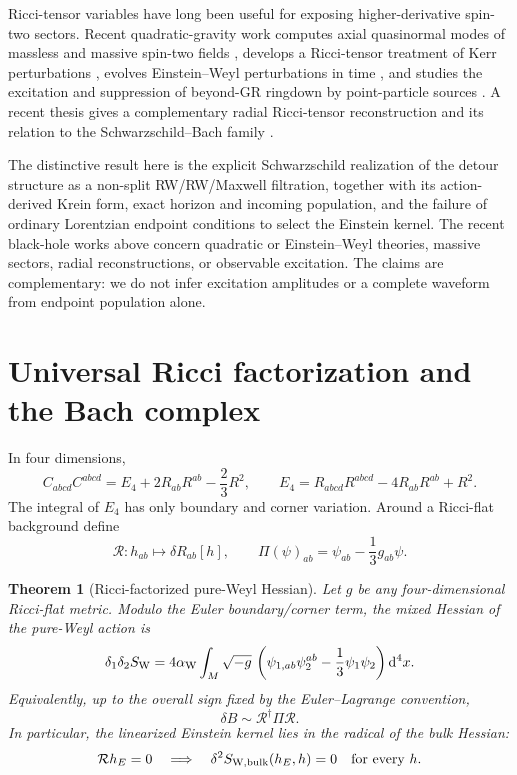 \documentclass[11pt]{article}
\newtheorem{theorem}{Theorem}[section]
\theoremstyle{definition}
\theoremstyle{remark}
\newcommand{\dd}{\mathrm d}
\begin{document}
Ricci-tensor variables have long been useful for exposing higher-derivative
spin-two sectors.  Recent quadratic-gravity work computes axial quasinormal
modes of massless and massive spin-two fields \cite{Antoniou2025}, develops a
Ricci-tensor treatment of Kerr perturbations \cite{Knoska2025}, evolves
Einstein--Weyl perturbations in time \cite{Konoplya2025}, and studies the
excitation and suppression of beyond-GR ringdown by point-particle sources
\cite{Antoniou2026}.  A recent thesis gives a complementary radial
Ricci-tensor reconstruction and its relation to the Schwarzschild--Bach
family \cite{Tajcovsky2026}.

The distinctive result here is the explicit Schwarzschild realization of
the detour structure as a non-split RW/RW/Maxwell filtration, together with
its action-derived Krein form, exact horizon and incoming population, and the
failure of ordinary Lorentzian endpoint conditions to select the Einstein
kernel.  The recent black-hole works above concern quadratic or
Einstein--Weyl theories, massive sectors, radial reconstructions, or
observable excitation.  The claims are complementary: we do not infer
excitation amplitudes or a complete waveform from endpoint population alone.

\section{Universal Ricci factorization and the Bach complex}
\label{sec:ricci-factorization}

In four dimensions,
\begin{equation}
\label{eq:weyl-euler}
C_{abcd}C^{abcd}
=
E_4+2R_{ab}R^{ab}-\frac23R^2,
\qquad
E_4=R_{abcd}R^{abcd}-4R_{ab}R^{ab}+R^2.
\end{equation}
The integral of \(E_4\) has only boundary and corner variation.  Around a
Ricci-flat background define
\[
\mathcal R:h_{ab}\longmapsto\delta R_{ab}[h],
\qquad
\Pi(\psi)_{ab}=\psi_{ab}-\frac13g_{ab}\psi.
\]

\begin{theorem}[Ricci-factorized pure-Weyl Hessian]
\label{thm:ricci-hessian}
Let \(g\) be any four-dimensional Ricci-flat metric.  Modulo the Euler
boundary/corner term, the mixed Hessian of the pure-Weyl action is
\begin{equation}
\label{eq:ricci-hessian}
\delta_1\delta_2 S_{\rm W}
=
4\alpha_{\rm W}\int_M\sqrt{-g}\,
\left(
\psi_{1,ab}\psi_2^{ab}-\frac13\psi_1\psi_2
\right)\dd^4x.
\end{equation}
Equivalently, up to the overall sign fixed by the Euler--Lagrange
convention,
\[
\delta B\sim\mathcal R^\dagger\Pi\mathcal R.
\]
In particular, the linearized Einstein kernel lies in the radical of the
bulk Hessian:
\[
\mathcal Rh_E=0
\quad\Longrightarrow\quad
\delta^2S_{\rm W,bulk}(h_E,h)=0
\quad\text{for every }h.
\]
\end{theorem}
\end{document}
